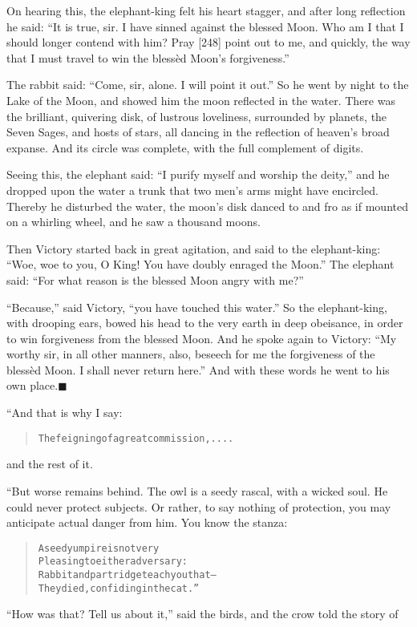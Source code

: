 \documentclass[article, twoside, 14pt]{memoir}
\newcommand{\qed}{\hfill \ensuremath{\blacksquare}}
\renewenvironment{verbatim}{%
\begin{quote}%
\vskip -10pt%
\begin{alltt}\normalfont\large}{\end{alltt}%
\end{quote}%
\vskip -10pt
} %
\begin{document}
On hearing this, the elephant-king felt his heart stagger, and
after long reflection he said:
``It is true, sir. I have sinned against the blessed Moon. Who am I that I should longer contend with him? Pray [248] point out to me, and quickly, the way that I must travel to win the blessèd Moon's forgiveness.''

The rabbit said: ``Come, sir, alone. I will point it out.'' So he
went by night to the Lake of the Moon, and showed him the moon
reflected in the water. There was the brilliant, quivering disk, of
lustrous loveliness, surrounded by planets, the Seven Sages, and
hosts of stars, all dancing in the reflection of heaven's broad
expanse. And its circle was complete, with the full complement of
digits.

Seeing this, the elephant said:
``I purify myself and worship the deity,'' and he dropped upon the
water a trunk that two men's arms might have encircled. Thereby he
disturbed the water, the moon's disk danced to and fro as if
mounted on a whirling wheel, and he saw a thousand moons.

Then Victory started back in great agitation, and said to the
elephant-king:
``Woe, woe to you, O King! You have doubly enraged the Moon.'' The
elephant said:
``For what reason is the blessed Moon angry with me?''

``Because,'' said Victory, ``you have touched this water.'' So the
elephant-king, with drooping ears, bowed his head to the very earth
in deep obeisance, in order to win forgiveness from the blessed
Moon. And he spoke again to Victory:
``My worthy sir, in all other manners, also, beseech for me the forgiveness of the blessèd Moon. I shall never return here.''
And with these words he went to his own place.\hyperref[s49]{\qed}

“And that is why I say:

\begin{verbatim}
The feigning of a great commission,....
\end{verbatim}
and the rest of it.

“But worse remains behind. The owl is a seedy rascal, with a wicked
soul. He could never protect subjects. Or rather, to say nothing of
protection, you may anticipate actual danger from him. You know the
stanza:

\begin{verbatim}
A seedy umpire is not very
Pleasing to either adversary:
Rabbit and partridge teach you that--
They died, confiding in the cat.”
\end{verbatim}
``How was that? Tell us about it,'' said the birds, and the crow
told the story of
\end{document}
